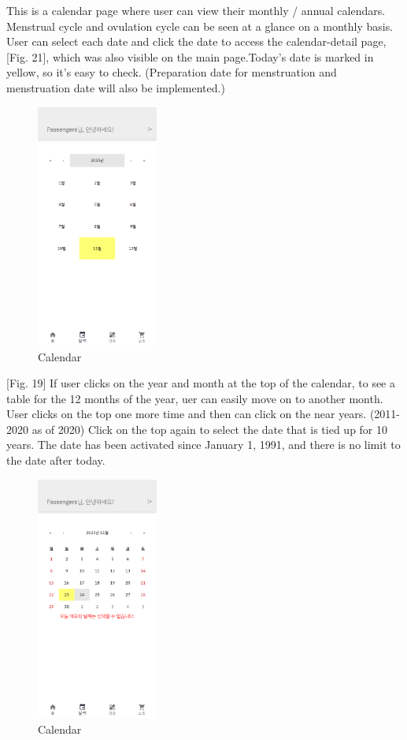 \documentclass[conference]{IEEEtran}
\begin{document}
\begin{itemize}
    [Fig. 18] This is a calendar page where user can view their monthly / annual calendars. Menstrual cycle and ovulation cycle can be seen at a glance on a monthly basis. User can select each date and click the date to access the calendar-detail page, [Fig. 21], which was also visible on the main page.Today's date is marked in yellow, so it's easy to check. (Preparation date for menstruation and menstruation date will also be implemented.)
    
    \begin{figure}[htbp]
    \includegraphics[width=4cm, height=8cm, center]{cal1.png}
    \caption{Calendar}
    \label{fig19}
    \end{figure}
    
    [Fig. 19] If user clicks on the year and month at the top of the calendar, to see a table for the 12 months of the year, uer can easily move on to another month. User clicks on the top one more time and then can click on the near years. (2011-2020 as of 2020) Click on the top again to select the date that is tied up for 10 years. The date has been activated since January 1, 1991, and there is no limit to the date after today.
    
    \begin{figure}[htbp]
    \includegraphics[width=4cm, height=8cm, center]{cal2.png}
    \caption{Calendar}
    \label{fig20}
    \end{figure}
    

\end{itemize}
\end{document}
